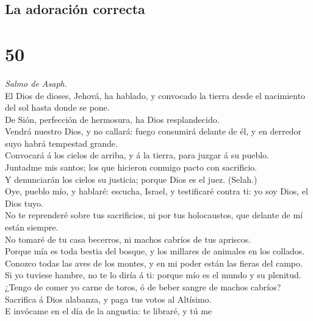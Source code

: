 \hypertarget{la-adoraciuxf3n-correcta}{%
\subsection{La adoración correcta}\label{la-adoraciuxf3n-correcta}}

\hypertarget{section-49}{%
\section{50}\label{section-49}}

 \emph{Salmo de Asaph.}\\
El Dios de dioses, Jehová, ha hablado, y convocado la tierra desde el
nacimiento del sol hasta donde se pone.\\
 De Sión, perfección de hermosura, ha Dios resplandecido.\\
 Vendrá nuestro Dios, y no callará: fuego consumirá delante
de él, y en derredor suyo habrá tempestad grande.\\
 Convocará á los cielos de arriba, y á la tierra, para
juzgar á su pueblo.\\
 Juntadme mis santos; los que hicieron conmigo pacto con
sacrificio.\\
 Y denunciarán los cielos su justicia; porque Dios es el
juez. (Selah.)\\
 Oye, pueblo mío, y hablaré: escucha, Israel, y testificaré
contra ti: yo soy Dios, el Dios tuyo.\\
 No te reprenderé sobre tus sacrificios, ni por tus
holocaustos, que delante de mí están siempre.\\
 No tomaré de tu casa becerros, ni machos cabríos de tus
apriscos.\\
 Porque mía es toda bestia del bosque, y los millares de
animales en los collados.\\
 Conozco todas las aves de los montes, y en mi poder están
las fieras del campo.\\
 Si yo tuviese hambre, no te lo diría á ti: porque mío es
el mundo y su plenitud.\\
 ¿Tengo de comer yo carne de toros, ó de beber sangre de
machos cabríos?\\
 Sacrifica á Dios alabanza, y paga tus votos al Altísimo.\\
 E invócame en el día de la angustia: te libraré, y tú me
